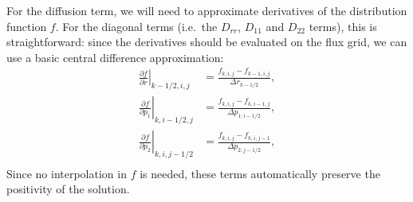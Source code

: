 \documentclass{notes}
\begin{document}
    For the diffusion term, we will need to approximate derivatives of the
    distribution function $f$. For the diagonal terms (i.e.\ the $D_{rr}$,
    $D_{11}$ and $D_{22}$ terms), this is straightforward: since the derivatives
    should be evaluated on the flux grid, we can use a basic central difference
    approximation:
    \begin{align}
        \left.\frac{\partial f}{\partial r}\right|_{k-1/2,i,j} &=
            \frac{f_{k,i,j} - f_{k-1,i,j}}{\Delta r_{k-1/2}},\\
        \left.\frac{\partial f}{\partial p_1}\right|_{k,i-1/2,j} &=
            \frac{f_{k,i,j} - f_{k,i-1,j}}{\Delta p_{1; i-1/2}},\\
        \left.\frac{\partial f}{\partial p_2}\right|_{k,i,j-1/2} &=
            \frac{f_{k,i,j} - f_{k,i,j-1}}{\Delta p_{2; j-1/2}},\\
    \end{align}
    Since no interpolation in $f$ is needed, these terms automatically preserve
    the positivity of the solution.
\end{document}
